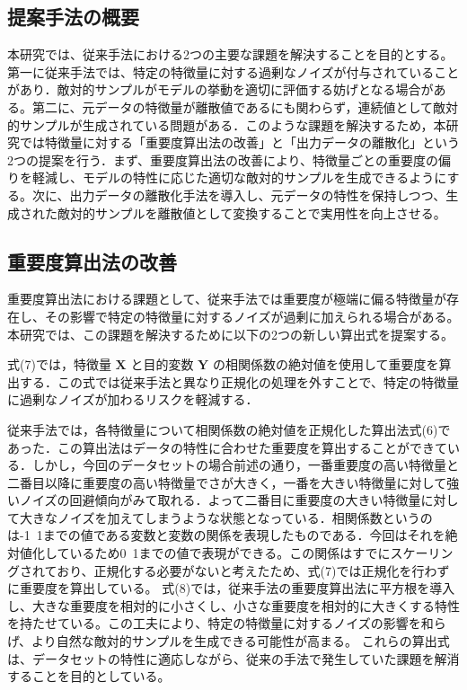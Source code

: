 \subsection{提案手法の概要}
本研究では、従来手法における2つの主要な課題を解決することを目的とする。第一に従来手法では、特定の特徴量に対する過剰なノイズが付与されていることがあり．敵対的サンプルがモデルの挙動を適切に評価する妨げとなる場合がある。第二に、元データの特徴量が離散値であるにも関わらず，連続値として敵対的サンプルが生成されている問題がある．このような課題を解決するため，本研究では特徴量に対する「重要度算出法の改善」と「出力データの離散化」という2つの提案を行う．まず、重要度算出法の改善により、特徴量ごとの重要度の偏りを軽減し、モデルの特性に応じた適切な敵対的サンプルを生成できるようにする。次に、出力データの離散化手法を導入し、元データの特性を保持しつつ、生成された敵対的サンプルを離散値として変換することで実用性を向上させる。

\subsection{重要度算出法の改善}
重要度算出法における課題として、従来手法では重要度が極端に偏る特徴量が存在し、その影響で特定の特徴量に対するノイズが過剰に加えられる場合がある。本研究では、この課題を解決するために以下の2つの新しい算出式を提案する。


式(7)では，特徴量 $\bm{X}$ と目的変数 $\bm{Y}$ の相関係数の絶対値を使用して重要度を算出する．この式では従来手法と異なり正規化の処理を外すことで、特定の特徴量に過剰なノイズが加わるリスクを軽減する．

従来手法では，各特徴量について相関係数の絶対値を正規化した算出法式(6)であった．この算出法はデータの特性に合わせた重要度を算出することができている．しかし，今回のデータセットの場合前述の通り，一番重要度の高い特徴量と二番目以降に重要度の高い特徴量でさが大きく，一番を大きい特徴量に対して強いノイズの回避傾向がみて取れる．よって二番目に重要度の大きい特徴量に対して大きなノイズを加えてしまうような状態となっている．相関係数というのは-1~1までの値である変数と変数の関係を表現したものである．今回はそれを絶対値化しているため0~1までの値で表現ができる。この関係はすでにスケーリングされており、正規化する必要がないと考えたため、式(7)では正規化を行わずに重要度を算出している。
式(8)では，従来手法の重要度算出法に平方根を導入し、大きな重要度を相対的に小さくし、小さな重要度を相対的に大きくする特性を持たせている。この工夫により、特定の特徴量に対するノイズの影響を和らげ、より自然な敵対的サンプルを生成できる可能性が高まる。
これらの算出式は、データセットの特性に適応しながら、従来の手法で発生していた課題を解消することを目的としている。

